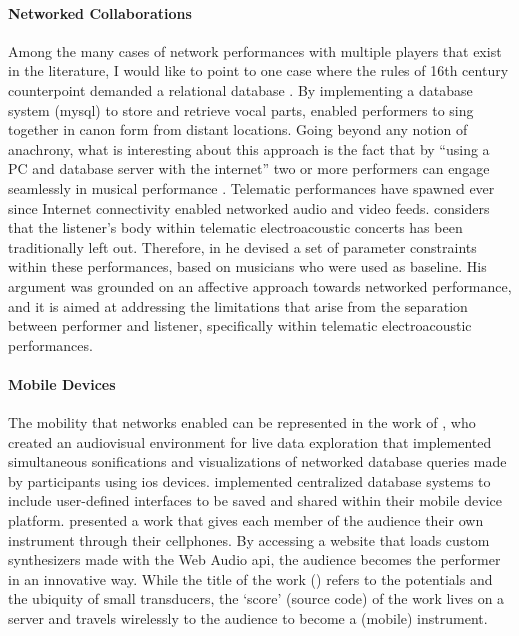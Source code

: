 	\paragraph{Networked Collaborations}
	Among the many cases of network performances with multiple players that exist in the literature, I would like to point to one case where the rules of 16th century counterpoint demanded a relational database \parencite{Nakamoto2007}. By implementing a database system (\gls{mysql}) to store and retrieve vocal parts, \citeauthor{Nakamoto2007} enabled performers to sing together in canon form from distant locations. Going beyond any notion of anachrony, what is interesting about this approach is the fact that by ``using a PC and database server with the internet'' two or more performers can engage seamlessly in musical performance \parencite{Nakamoto2007}. Telematic performances have spawned ever since Internet connectivity enabled networked audio and video feeds. \textcite{icmc/bbp2372.2014.046} considers that the listener's body within telematic electroacoustic concerts has been traditionally left out. Therefore, in he devised a set of parameter constraints within these performances, based on musicians who were used as baseline. His argument was grounded on an affective approach towards networked performance, and it is aimed at addressing the limitations that arise from the separation between performer and listener, specifically within telematic electroacoustic performances.

	\paragraph{Mobile Devices}
	The mobility that networks enabled can be represented in the work of 
	\textcite{Liu:2013}, who created an audiovisual environment for live data exploration that implemented simultaneous sonifications and visualizations of networked database queries made by participants using \gls{ios} devices. \textcite{btaylor:2014} implemented centralized database systems to include user-defined interfaces to be saved and shared within their mobile device platform. \textcite{Rya17:OnT} presented a work that gives each member of the audience their own instrument through their cellphones. By accessing a website that loads custom synthesizers made with the Web Audio \gls{api}, the audience becomes the performer in an innovative way. While the title of the work (\textcite{Rya17:OnT}) refers to the potentials and the ubiquity of small transducers, the `score' (source code) of the work lives on a server and travels wirelessly to the audience to become a (mobile) instrument.

